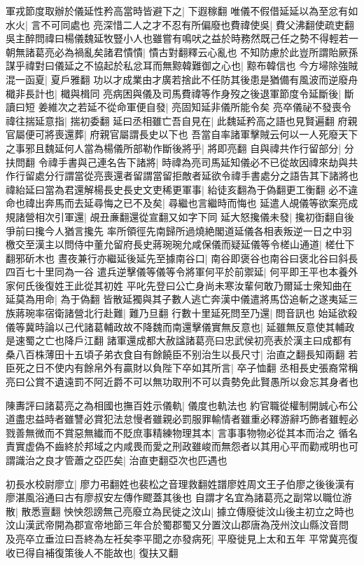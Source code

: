 軍戎節度取辦於儀延性矜高當時皆避下之|{
	下遐稼翻}
唯儀不假借延延以為至忿有如水火|{
	言不可同處也}
亮深惜二人之才不忍有所偏廢也費禕使吳|{
	費父沸翻使疏吏翻}
吳主醉問禕曰楊儀魏延牧豎小人也雖嘗有鳴吠之益於時務然既己任之勢不得輕若一朝無諸葛亮必為禍亂矣諸君憒憒|{
	憒古對翻釋云心亂也}
不知防慮於此豈所謂貽厥孫謀乎禕對曰儀延之不協起於私忿耳而無黥韓難御之心也|{
	黥布韓信也}
今方埽除強賊混一函夏|{
	夏戶雅翻}
功以才成業由才廣若捨此不任防其後患是猶備有風波而逆廢舟檝非長計也|{
	檝與楫同}
亮病困與儀及司馬費禕等作身歿之後退軍節度令延斷後|{
	斷讀曰短}
姜維次之若延不從命軍便自發|{
	亮固知延非儀所能令矣}
亮卒儀祕不發喪令禕往揣延意指|{
	揣初委翻}
延曰丞相雖亡吾自見在|{
	此魏延矜高之語也見賢遍翻}
府親官屬便可將喪還葬|{
	府親官屬謂長史以下也}
吾當自率諸軍擊賊云何以一人死廢天下之事邪且魏延何人當為楊儀所部勒作斷後將乎|{
	將即亮翻}
自與禕共作行留部分|{
	分扶問翻}
令禕手書與己連名告下諸將|{
	時禕為亮司馬延知儀必不已從故因禕來劫與共作行留處分行謂當從亮喪還者留謂當留拒敵者延欲令禕手書處分之語告其下諸將也}
禕紿延曰當為君還解楊長史長史文吏稀更軍事|{
	紿徒亥翻為于偽翻更工衡翻}
必不違命也禕出奔馬而去延尋悔之已不及矣|{
	尋繼也言繼時而悔也}
延遣人覘儀等欲案亮成規諸營相次引軍還|{
	覘丑亷翻還從宣翻又如字下同}
延大怒攙儀未發|{
	攙初衘翻自後爭前曰攙今人猶言攙先}
率所領徑先南歸所過燒絶閣道延儀各相表叛逆一日之中羽檄交至漢主以問侍中董允留府長史蔣琬琬允咸保儀而疑延儀等令槎山通道|{
	槎仕下翻邪斫木也}
晝夜兼行亦繼延後延先至據南谷口|{
	南谷即褒谷也南谷曰褒北谷曰斜長四百七十里同為一谷}
遣兵逆擊儀等儀等令將軍何平於前禦延|{
	何平即王平也本養外家何氏後復姓王此從其初姓}
平叱先登曰公亡身尚未寒汝輩何敢乃爾延士衆知曲在延莫為用命|{
	為于偽翻}
皆散延獨與其子數人逃亡奔漢中儀遣將馬岱追斬之遂夷延三族蔣琬率宿衛諸營北行赴難|{
	難乃旦翻}
行數十里延死問至乃還|{
	問音訊也}
始延欲殺儀等冀時論以己代諸葛輔政故不降魏而南還擊儀實無反意也|{
	延雖無反意使其輔政是速蜀之亡也降戶江翻}
諸軍還成都大赦諡諸葛亮曰忠武侯初亮表於漢主曰成都有桑八百株薄田十五頃子弟衣食自有餘饒臣不别治生以長尺寸|{
	治直之翻長知兩翻}
若臣死之日不使内有餘帛外有贏財以負陛下卒如其所言|{
	卒子恤翻}
丞相長史張裔常稱亮曰公賞不遺遠罰不阿近爵不可以無功取刑不可以貴勢免此賢愚所以僉忘其身者也

陳夀評曰諸葛亮之為相國也撫百姓示儀軌|{
	儀度也軌法也}
約官職從權制開誠心布公道盡忠益時者雖讐必賞犯法怠慢者雖親必罰服罪輸情者雖重必釋游辭巧飾者雖輕必戮善無微而不賞惡無纎而不貶庶事精練物理其本|{
	言事事物物必從其本而治之}
循名責實虚偽不齒終於邦域之内咸畏而愛之刑政雖峻而無怨者以其用心平而勸戒明也可謂識治之良才管蕭之亞匹矣|{
	治直吏翻亞次也匹遇也}


初長水校尉廖立|{
	廖力弔翻姓也裴松之音理救翻姓譜廖姓周文王子伯廖之後後漢有廖湛風浴通曰古有廖叔安左傳作飂蓋其後也}
自謂才名宜為諸葛亮之副常以職位游散|{
	散悉亶翻}
怏怏怨謗無己亮廢立為民徙之汶山|{
	據立傳廢徙汶山後主初立之時也汶山漢武帝開為郡宣帝地節三年合於蜀郡蜀又分置汶山郡唐為茂州汶山縣汶音問}
及亮卒立垂泣曰吾終為左衽矣李平聞之亦發病死|{
	平廢徙見上太和五年}
平常冀亮復收已得自補復策後人不能故也|{
	復扶又翻}


